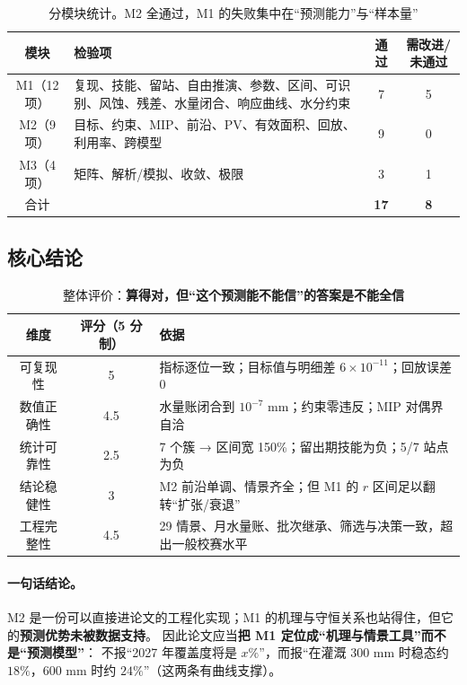 \documentclass[11pt,a4paper]{ctexart}
\begin{document}
\begin{table}[htbp]\centering\small
\begin{tabularx}{\textwidth}{|c|X|c|c|}
\toprule
模块 & 检验项 & 通过 & 需改进/未通过 \\
\midrule
M1（12 项） & 复现、技能、留站、自由推演、参数、区间、可识别、风蚀、残差、水量闭合、响应曲线、水分约束 & 7 & 5 \\
M2（9 项） & 目标、约束、MIP、前沿、PV、有效面积、回放、利用率、跨模型 & 9 & 0 \\
M3（4 项） & 矩阵、解析/模拟、收敛、极限 & 3 & 1 \\
\midrule
合计 & & \textbf{17} & \textbf{8} \\
\bottomrule
\end{tabularx}
\caption{分模块统计。M2 全通过，M1 的失败集中在“预测能力”与“样本量”}\label{tab:score}
\end{table}

\subsection{核心结论}

\begin{table}[htbp]\centering\small
\begin{tabularx}{\textwidth}{|c|c|X|}
\toprule
维度 & 评分（5 分制） & 依据 \\
\midrule
可复现性 & 5 & 指标逐位一致；目标值与明细差 $6\times10^{-11}$；回放误差 0 \\
数值正确性 & 4.5 & 水量账闭合到 $10^{-7}$ mm；约束零违反；MIP 对偶界自洽 \\
统计可靠性 & 2.5 & 7 个簇 → 区间宽 150\%；留出期技能为负；5/7 站点为负 \\
结论稳健性 & 3 & M2 前沿单调、情景齐全；但 M1 的 $r$ 区间足以翻转“扩张/衰退” \\
工程完整性 & 4.5 & 29 情景、月水量账、批次继承、筛选与决策一致，超出一般校赛水平 \\
\bottomrule
\end{tabularx}
\caption{整体评价：\textbf{算得对，但“这个预测能不能信”的答案是不能全信}}\label{tab:grade}
\end{table}

\paragraph{一句话结论。}
M2 是一份可以直接进论文的工程化实现；M1 的机理与守恒关系也站得住，但它的\textbf{预测优势未被数据支持}。
因此论文应当\textbf{把 M1 定位成“机理与情景工具”而不是“预测模型”}：
不报“2027 年覆盖度将是 $x\%$”，而报“在灌溉 300 mm 时稳态约 $18\%$，600 mm 时约 $24\%$”（这两条有曲线支撑）。
\end{document}

